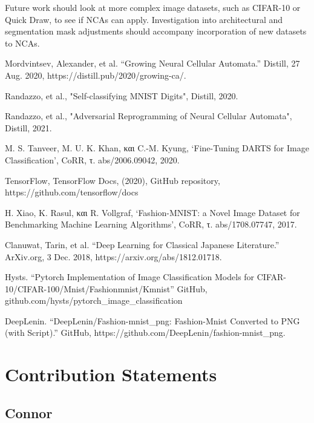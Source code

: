 \documentclass[conference]{IEEEtran}
\begin{document}
Future work should look at more complex image datasets, such as CIFAR-10 or Quick Draw, to see if NCAs can apply. Investigation into architectural and segmentation mask adjustments should accompany incorporation of new datasets to NCAs.

\begin{thebibliography}{00}

 Mordvintsev, Alexander, et al. “Growing Neural Cellular Automata.” Distill, 27 Aug. 2020, https://distill.pub/2020/growing-ca/. 

 Randazzo, et al., "Self-classifying MNIST Digits", Distill, 2020.

 Randazzo, et al., "Adversarial Reprogramming of Neural Cellular Automata", Distill, 2021.

 M. S. Tanveer, M. U. K. Khan, και C.-M. Kyung, ‘Fine-Tuning DARTS for Image Classification’, CoRR, τ. abs/2006.09042, 2020.

 TensorFlow, TensorFlow Docs, (2020), GitHub repository, https://github.com/tensorflow/docs

 H. Xiao, K. Rasul, και R. Vollgraf, ‘Fashion-MNIST: a Novel Image Dataset for Benchmarking Machine Learning Algorithms’, CoRR, τ. abs/1708.07747, 2017.

 Clanuwat, Tarin, et al. “Deep Learning for Classical Japanese Literature.” ArXiv.org, 3 Dec. 2018, https://arxiv.org/abs/1812.01718. 

  Hysts. “Pytorch Implementation of Image Classification Models for CIFAR-10/CIFAR-100/Mnist/Fashionmnist/Kmnist” GitHub, github.com/hysts/pytorch\_image\_classification

 DeepLenin. “DeepLenin/Fashion-mnist\_png: Fashion-Mnist Converted to PNG (with Script).” GitHub, https://github.com/DeepLenin/fashion-mnist_png. 

\end{thebibliography}

\section*{Contribution Statements}

\subsection{Connor}
\end{document}
